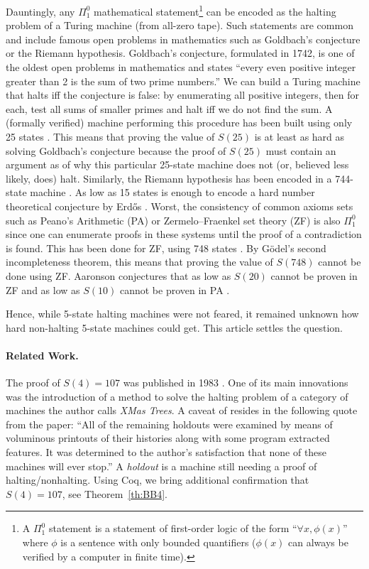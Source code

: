 \documentclass[a4paper,british]{article}
\theoremstyle{definition} %
\numberwithin{equation}{section}
\theoremstyle{definition} %
\newcommand{\BBtheFourth}{107}
\begin{document}
Dauntingly, any $\Pi_1^0$ mathematical statement\footnote{A $\Pi_1^0$ statement is a statement of first-order logic of the form ``$\forall x, \phi(x)$'' where $\phi$ is a sentence with only bounded quantifiers (\ie $\phi(x)$ can always be verified by a computer in finite time).} can be encoded as the halting problem of a Turing machine (from all-zero tape). Such statements are common and include famous open problems in mathematics such as Goldbach's conjecture or the Riemann hypothesis. Goldbach's conjecture, formulated in 1742, is one of the oldest open problems in mathematics and states ``every even positive integer greater than 2 is the sum of two prime numbers.'' We can build a Turing machine that halts iff the conjecture is false: by enumerating all positive integers, then for each, test all sums of smaller primes and halt iff we do not find the sum. A (formally verified) machine performing this procedure has been built using only 25 states \cite{GoldbachTM27, GoldbachTM25}. This means that proving the value of $S(25)$ is at least as hard as solving Goldbach's conjecture because the proof of $S(25)$ must contain an argument as of why this particular 25-state machine does not (or, believed less likely, does) halt. Similarly, the Riemann hypothesis has been encoded in a 744-state machine \cite{RiemannTM,Yedidia2016,BusyBeaverFrontier}. As low as 15 states is enough to encode a hard number theoretical conjecture by Erd\H{o}s \cite{BB15}. Worst, the consistency of common axioms sets such as Peano's Arithmetic (PA) or Zermelo–Fraenkel set theory (ZF) is also $\Pi_1^0$ since one can enumerate proofs in these systems until the proof of a contradiction is found. This has been done for ZF, using 748 states \cite{ZFTM,Yedidia2016,BusyBeaverFrontier,BB748Thesis}. By G\"odel's second incompleteness theorem, this means that proving the value of $S(748)$ cannot be done using ZF. Aaronson conjectures that as low as $S(20)$ cannot be proven in ZF and as low as $S(10)$ cannot be proven in PA \cite{BusyBeaverFrontier}.

Hence, while 5-state halting machines were not feared, it remained unknown how hard non-halting 5-state machines could get. This article settles the question.

\paragraph{Related Work.} The proof of $S(4) = \BBtheFourth$ was published in 1983 \cite{Brady83}. One of its main innovations was the introduction of a method to solve the halting problem of a category of machines the author calls \textit{XMas Trees}. A caveat of \cite{Brady83} resides in the following quote from the paper: ``All of the remaining holdouts were examined by means of voluminous printouts of their histories along with some program extracted features. It was determined to the author's satisfaction that none of these machines will ever stop.'' A \textit{holdout} is a machine still needing a proof of halting/nonhalting. Using Coq, we bring additional confirmation that $S(4) = \BBtheFourth$, see Theorem~\ref{th:BB4}.
\end{document}
